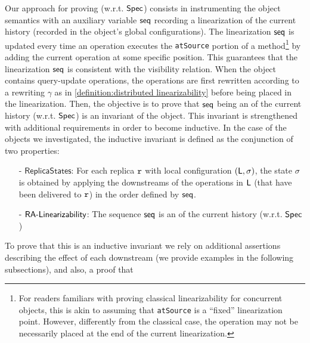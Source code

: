 Our approach for proving \CRDTLin{} (w.r.t. $\mathsf{Spec}{}$) consists in instrumenting the object semantics with an auxiliary variable $\mathsf{seq}$ recording a linearization of the current history (recorded in the object's global configurations). 
The linearization $\mathsf{seq}$ is updated every time an operation executes the {\tt atSource} portion of a method\footnote{For readers familiars with proving classical linearizability for concurrent objects, this is akin to assuming that {\tt atSource} is a ``fixed'' linearization point. However, differently from the classical case, the operation may not be necessarily placed at the end of the current linearization.} by adding the current operation at some specific position. This guarantees that the linearization $\mathsf{seq}$ is consistent with the visibility relation.
When the object contains query-update operations, the operations are first rewritten according to a rewriting $\gamma$ as in \autoref{definition:distributed linearizability} before being placed in the linearization. 
Then, the objective is to prove that $\mathsf{seq}$ being an \crdtlinearization{} of the current history (w.r.t. $\mathsf{Spec}{}$) is an invariant of the object. This invariant is strengthened with additional requirements in order to become inductive. In the case of the objects we investigated, the inductive invariant is defined as the conjunction of two properties:
\begin{itemize}
\item[-] $\mathsf{ReplicaStates}$: For each replica $\mathtt{r}$ with local configuration $(\mathsf{L},\sigma)$, the state $\sigma$ is obtained by applying the downstreams of the operations in $\mathsf{L}$ (that have been delivered to $\mathtt{r}$) in the order defined by $\mathsf{seq}$.  

\item[-] $\mathsf{RA\text{-}Linearizability{}}$: The sequence $\mathsf{seq}$ is an \crdtlinearization{} of the current history (w.r.t. $\mathsf{Spec}{}$) 
\end{itemize}
To prove that this is an inductive invariant we rely on additional assertions describing the effect of each downstream (we provide examples in the following subsections), and also, a proof that 
\begin{itemize}
\end{itemize}
